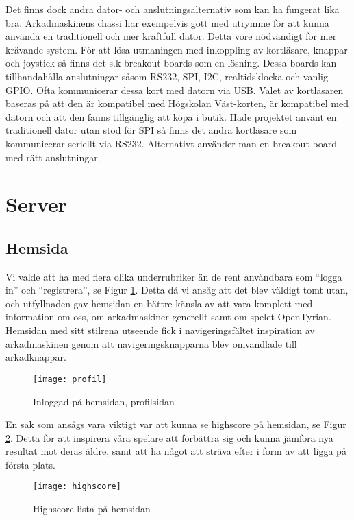 \documentclass[12pt,fleqn,openany]{book} %
\begin{document}
Det finns dock andra dator- och anslutningsalternativ som kan ha fungerat lika bra. Arkadmaskinens chassi har exempelvis gott med utrymme 
för att kunna använda en traditionell och mer kraftfull dator. Detta vore nödvändigt för mer krävande system. För att lösa utmaningen med 
inkoppling av kortläsare, knappar och joystick så finns det s.k breakout boards som en lösning. Dessa boards kan tillhandahålla anslutningar 
såsom RS232, SPI, I2C, realtidsklocka och vanlig GPIO. Ofta kommunicerar dessa kort med datorn via USB. Valet av kortläsaren baseras på att 
den är kompatibel med Högskolan Väst-korten, är kompatibel med datorn och att den fanns tillgänglig att köpa i butik. Hade projektet använt 
en traditionell dator utan stöd för SPI så finns det andra kortläsare som kommunicerar seriellt via RS232. Alternativt använder man en 
breakout board med rätt anslutningar.

\section{Server}

\subsection{Hemsida}

Vi valde att ha med flera olika underrubriker än de rent användbara som “logga in” och “registrera”, se Figur \ref{fig_profilsida}.
Detta då vi ansåg att det blev väldigt tomt utan, och utfyllnaden gav hemsidan en bättre känsla av att vara komplett med information om 
oss, om arkadmaskiner generellt samt om spelet OpenTyrian. Hemsidan med sitt stilrena utseende fick i navigeringsfältet inspiration av arkadmaskinen genom att navigeringsknapparna blev 
omvandlade till arkadknappar. 

\begin{figure}[h]
\centering\texttt{[image: profil]}
\caption{Inloggad på hemsidan, profilsidan}
\label{fig_profilsida}
\end{figure}

En sak som ansågs vara viktigt var att kunna se highscore på hemsidan, se Figur \ref{fig_highscore}. Detta för att inspirera våra spelare att förbättra sig och kunna
jämföra nya resultat mot deras äldre, samt att ha något att sträva efter i form av att ligga på första plats.

\begin{figure}[!h]
\centering\texttt{[image: highscore]}
\caption{Highscore-lista på hemsidan}
\label{fig_highscore}
\end{figure}
\end{document}
